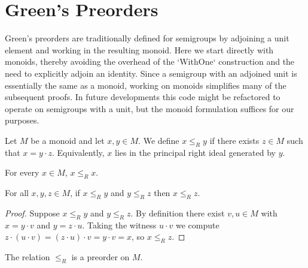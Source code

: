 
\section{Green's Preorders}

Green's preorders are traditionally defined for semigroups by adjoining a unit element and working in the resulting monoid.  Here we start directly with monoids, thereby avoiding the overhead of the `WithOne` construction and the need to explicitly adjoin an identity.  Since a semigroup with an adjoined unit is essentially the same as a monoid, working on monoids simplifies many of the subsequent proofs.  In future developments this code might be refactored to operate on semigroups with a unit, but the monoid formulation suffices for our purposes.

\begin{definition}
\label{def:RRel}
Let \(M\) be a monoid and let \(x,y\in M\).  We define
\(x \le_R y\) if there exists \(z\in M\) such that \(x = y\cdot z\).
Equivalently, \(x\) lies in the principal right ideal generated by \(y\).
\leanok
\end{definition}
\begin{lemma}[Reflexivity of \(\le_R\)]
\label{lem:RRel-refl}
For every \(x\in M\), \(x \le_R x\).
\leanok
{}
\end{lemma}

\begin{lemma}[Transitivity of \(\le_R\)]
\label{lem:RRel-trans}
For all \(x,y,z\in M\), if \(x \le_R y\) and \(y \le_R z\) then \(x \le_R z\).
\leanok
{}
\end{lemma}
\begin{proof}
\leanok
Suppose \(x \le_R y\) and \(y \le_R z\).  By definition there exist \(v,u\in M\) with \(x = y\cdot v\) and \(y = z\cdot u\).  Taking the witness \(u\cdot v\) we compute \(z\cdot(u\cdot v) = (z\cdot u)\cdot v = y\cdot v = x\), so \(x \le_R z\).
\end{proof}

\begin{lemma}
\label{lem:RRel-isPreorder}
The relation \(\le_R\) is a preorder on \(M\).
\leanok
{}
\end{lemma}

